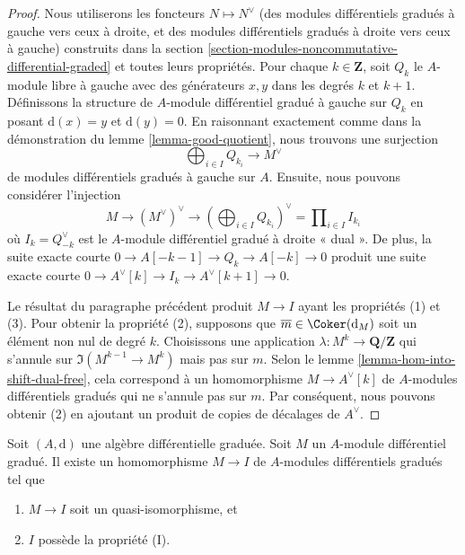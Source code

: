 \begin{proof}
Nous utiliserons les foncteurs $N \mapsto N^\vee$ (des modules
différentiels gradués à gauche vers ceux à droite, et des modules différentiels
gradués à droite vers ceux à gauche)
construits dans la section
\ref{section-modules-noncommutative-differential-graded} et toutes leurs propriétés.
Pour chaque $k \in \mathbf{Z}$, soit $Q_k$ le $A$-module libre à gauche avec des
générateurs $x, y$ dans les degrés $k$ et $k + 1$. Définissons la structure de $A$-module
différentiel gradué à gauche sur $Q_k$ en posant $\text{d}(x) = y$ et $\text{d}(y) =
0$. En raisonnant exactement comme dans la démonstration du lemme
\ref{lemma-good-quotient}, nous trouvons une surjection
$$
\bigoplus\nolimits_{i \in I} Q_{k_i} \longrightarrow M^\vee
$$
de modules différentiels gradués à gauche sur $A$. Ensuite, nous pouvons considérer l'injection
$$
M \to (M^\vee)^\vee \to (\bigoplus\nolimits_{i \in I} Q_{k_i})^\vee =
\prod\nolimits_{i \in I} I_{k_i}
$$
où $I_k = Q_{-k}^\vee$ est le $A$-module différentiel gradué à droite « dual ».
De plus, la suite exacte courte $0 \to A[-k - 1] \to Q_k \to A[-k] \to 0$
produit une suite exacte courte
$0 \to A^\vee[k] \to I_k \to A^\vee[k + 1] \to 0$.

\medskip\noindent
Le résultat du paragraphe précédent produit $M \to I$ ayant
les propriétés (1) et (3). Pour obtenir la propriété (2), supposons que
$\overline{m} \in \Coker(\text{d}_M)$ soit un élément non nul de degré
$k$. Choisissons une application $\lambda : M^k \to \mathbf{Q}/\mathbf{Z}$
qui s'annule sur $\Im(M^{k - 1} \to M^k)$ mais pas sur $m$. Selon le
lemme \ref{lemma-hom-into-shift-dual-free}, cela
correspond à un homomorphisme $M \to A^\vee[k]$ de $A$-modules
différentiels gradués qui ne s'annule pas sur $m$. Par conséquent,
nous pouvons obtenir (2) en ajoutant un
produit de copies de décalages de $A^\vee$.
\end{proof}

\begin{lemma}
\label{lemma-right-resolution}
Soit $(A, \text{d})$ une algèbre différentielle
graduée. Soit $M$ un $A$-module différentiel gradué. Il existe un homomorphisme
$M \to I$ de $A$-modules différentiels gradués tel que
\begin{enumerate}
\item $M \to I$ soit un quasi-isomorphisme, et
\item $I$ possède la propriété (I).
\end{enumerate}
\end{lemma}

